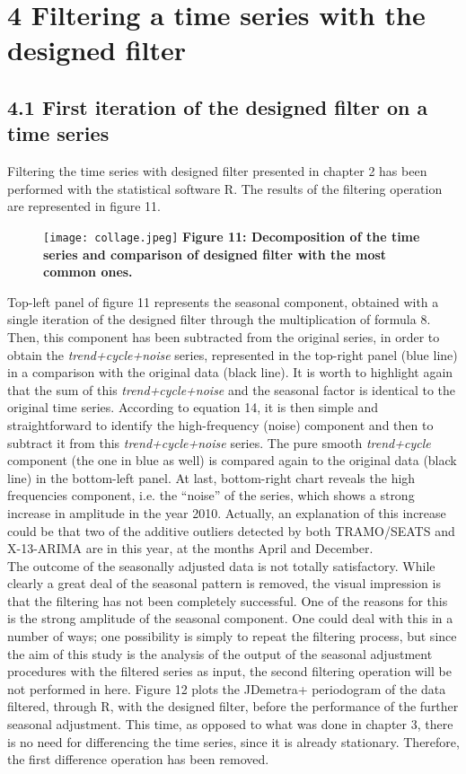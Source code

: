 \documentclass{article}
\begin{document}
\section*{4 Filtering a time series with the designed filter}
\subsection*{\small 4.1 First iteration of the designed filter on a time series}
Filtering the time series with designed filter presented in chapter 2 has been performed with the statistical software R. The results of the filtering operation are represented in figure 11.
\begin{figure}[H]
  \texttt{[image: collage.jpeg]}
  {\textbf{\scriptsize Figure 11: Decomposition of the time series and comparison of designed filter with the most common ones.}}
  \label{fig:1}
\end{figure}
Top-left panel of figure 11 represents the seasonal component, obtained with a single iteration of the designed filter through the multiplication of formula 8. Then, this component has been subtracted from the original series, in order to obtain the \textit{trend+cycle+noise} series, represented in the top-right panel (blue line) in a comparison with the original data (black line). It is worth to highlight again that the sum of this \textit{trend+cycle+noise} and the seasonal factor is identical to the original time series. According to equation 14, it is then simple and straightforward to identify the high-frequency (noise) component and then to subtract it from this \textit{trend+cycle+noise} series. The pure smooth \textit{trend+cycle} component (the one in blue as well) is compared again to the original data (black line) in the bottom-left panel. At last, bottom-right chart reveals the high frequencies component, i.e. the ``noise'' of the series, which shows a strong increase in amplitude in the year 2010. Actually, an explanation of this increase could be that two of the additive outliers detected by both TRAMO/SEATS and X-13-ARIMA are in this year, at the months April and December.\\The outcome of the seasonally adjusted data is not totally satisfactory. While clearly a great deal of the seasonal pattern is removed, the visual impression is that the filtering has not been completely successful. One of the reasons for this is the strong amplitude of the seasonal component. One could deal with this in a number of ways; one possibility is simply to repeat the filtering process, but since the aim of this study is the analysis of the output of the seasonal adjustment procedures with the filtered series as input, the second filtering operation will be not performed in here. Figure 12 plots the JDemetra+ periodogram of the data filtered, through R, with the designed filter, before the performance of the further seasonal adjustment. This time, as opposed to what was done in chapter 3, there is no need for differencing the time series, since it is already stationary. Therefore, the first difference operation has been removed.\\ 
\end{document}

